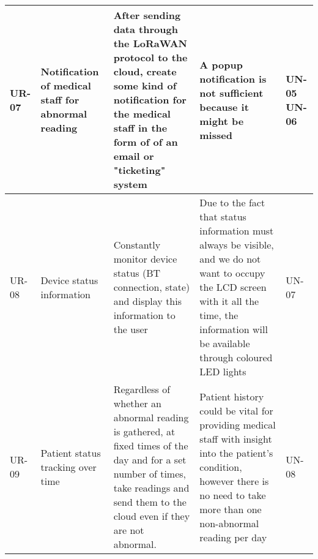\begin{landscape}
\begin{longtable}{|p{2cm}|>{\RaggedRight\arraybackslash}p{6cm}|>{\RaggedRight\arraybackslash}p{6cm}|>{\RaggedRight\arraybackslash}p{6cm}|p{2cm}|}
\hline
UR-07 & Notification of medical staff for abnormal reading & After sending data through the LoRaWAN protocol to the cloud, create some kind of notification for the medical staff in the form of of an email or "ticketing" system & A popup notification is not sufficient because it might be missed & UN-05 \newline UN-06 \\
\hline
UR-08 & Device status information & Constantly monitor device status (BT connection, state) and display this information to the user & Due to the fact that status information must always be visible, and we do not want to occupy the LCD screen with it all the time, the information will be available through coloured LED lights & UN-07 \\
\hline
UR-09 & Patient status tracking over time & Regardless of whether an abnormal reading is gathered, at fixed times of the day and for a set number of times, take readings and send them to the cloud even if they are not abnormal. & Patient history could be vital for providing medical staff with insight into the patient's condition, however there is no need to take more than one non-abnormal reading per day & UN-08 \\
\hline
\end{longtable}
\end{landscape}
